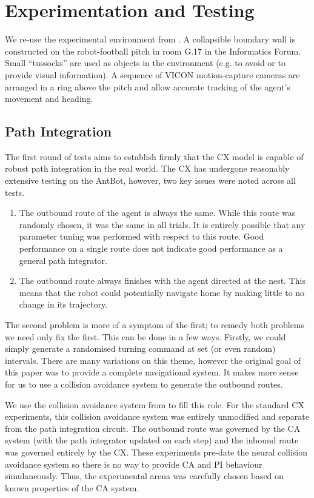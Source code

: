 \documentclass[a4paper,11pt,twoside,openright]{article}
\let\oldsection\section
\def\section{\cleardoublepage\oldsection}
\begin{document}
\section{Experimentation and Testing}\label{sec:test}
We re-use the experimental environment from \cite{Mitchell2018}. A
collapsible boundary wall is constructed on the robot-football pitch
in room G.17 in the Informatics Forum. Small ``tussocks'' are used as
objects in the environment (e.g. to avoid or to provide visual
information). A sequence of VICON motion-capture cameras are arranged
in a ring above the pitch and allow accurate tracking of the agent's
movement and heading.

\subsection{Path Integration}
The first round of tests aims to establish firmly that the CX model is capable of
robust path integration in the real world. The CX has undergone reasonably
extensive testing on the AntBot, however, two key issues were noted across all
tests.

\begin{enumerate}
\item{ The outbound route of the agent is always the same. While this
  route was randomly chosen, it was the same in all trials. It is
  entirely possible that any parameter tuning was performed with
  respect to this route. Good performance on a single route does not
  indicate good performance as a general path integrator.  }

\item{
  The outbound route always finishes with the agent directed at the nest. This
  means that the robot could potentially navigate home by making little to no
  change in its trajectory.
}
\end{enumerate}

The second problem is more of a symptom of the first; to remedy both problems we
need only fix the first. This can be done in a few ways. Firstly, we could
simply generate a randomised turning command at set (or even random) intervals.
There are many variations on this theme, however the original goal of this paper
was to provide a complete navigational system. It makes more sense for us to use
a collision avoidance system to generate the outbound routes.
\newline\par

We use the collision avoidance system from \cite{Mitchell2018} to fill this
role. For the standard CX experiments, this collision avoidance system was
entirely unmodified and separate from the path integration circuit. The outbound
route was governed by the CA system (with the path integrator updated on each
step) and the inbound route was governed entirely by the CX. These experiments
pre-date the neural collision avoidance system so there is no way to provide
CA and PI behaviour simulaneously. Thus, the experimental arena was carefully
chosen based on known properties of the CA system.
\newline
\par
\end{document}
